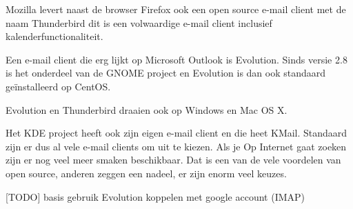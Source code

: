 Mozilla levert naast de browser Firefox ook een open source e-mail client met de naam
Thunderbird dit is een volwaardige e-mail client inclusief kalenderfunctionaliteit.

{
Een e-mail client die erg lijkt op Microsoft Outlook is Evolution. Sinds versie 2.8 is het onderdeel
van de GNOME project en Evolution is dan ook standaard ge\"installeerd op CentOS.}

{
Evolution en Thunderbird draaien ook op Windows en Mac OS X.}

{
Het KDE project heeft ook zijn eigen e-mail client en die heet KMail. Standaard zijn er dus al vele e-mail
clients om uit te kiezen. Als je Op Internet gaat zoeken zijn er nog veel meer smaken beschikbaar. Dat is een van de
vele voordelen van open source, anderen zeggen een nadeel, er zijn enorm veel keuzes.}

{
[TODO] basis gebruik Evolution koppelen met google account (IMAP)}
